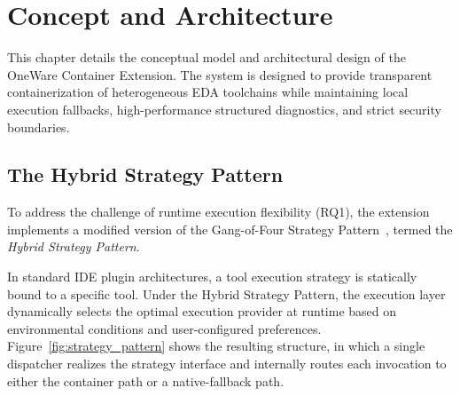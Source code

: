 % 
% 
% 

\chapter{Concept and Architecture}
\label{ch:concept}

This chapter details the conceptual model and architectural design of the OneWare Container Extension. The system is designed to provide transparent containerization of heterogeneous EDA toolchains while maintaining local execution fallbacks, high-performance structured diagnostics, and strict security boundaries.

\section{The Hybrid Strategy Pattern}
To address the challenge of runtime execution flexibility (RQ1), the extension implements a modified version of the Gang-of-Four Strategy Pattern~\cite{gamma1994design}, termed the \textit{Hybrid Strategy Pattern}. 

In standard IDE plugin architectures, a tool execution strategy is statically bound to a specific tool. Under the Hybrid Strategy Pattern, the execution layer dynamically selects the optimal execution provider at runtime based on environmental conditions and user-configured preferences. Figure~\ref{fig:strategy_pattern} shows the resulting structure, in which a single dispatcher realizes the strategy interface and internally routes each invocation to either the container path or a native-fallback path.

